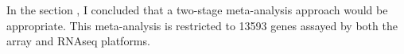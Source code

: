 In the section , I concluded that a two-stage meta-analysis approach would be appropriate.
This meta-analysis is restricted to 13593 genes assayed by both the array and \gls{RNAseq} platforms.
%
%
%
%
%
%
%
